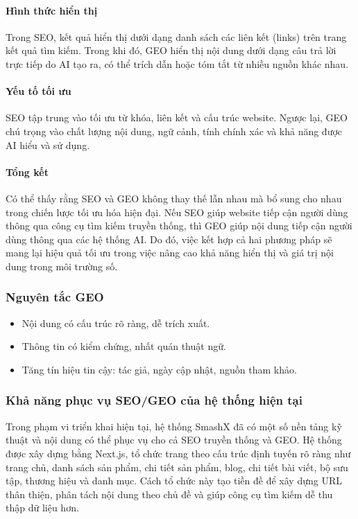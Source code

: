 \documentclass[13pt]{article}
\begin{document}
\paragraph{Hình thức hiển thị}
Trong SEO, kết quả hiển thị dưới dạng danh sách các liên kết (links) trên trang kết quả tìm kiếm. Trong khi đó, GEO hiển thị nội dung dưới dạng câu trả lời trực tiếp do AI tạo ra, có thể trích dẫn hoặc tóm tắt từ nhiều nguồn khác nhau.

\paragraph{Yếu tố tối ưu}
SEO tập trung vào tối ưu từ khóa, liên kết và cấu trúc website. Ngược lại, GEO chú trọng vào chất lượng nội dung, ngữ cảnh, tính chính xác và khả năng được AI hiểu và sử dụng.

\paragraph{Tổng kết}
Có thể thấy rằng SEO và GEO không thay thế lẫn nhau mà bổ sung cho nhau trong chiến lược tối ưu hóa hiện đại. Nếu SEO giúp website tiếp cận người dùng thông qua công cụ tìm kiếm truyền thống, thì GEO giúp nội dung tiếp cận người dùng thông qua các hệ thống AI. Do đó, việc kết hợp cả hai phương pháp sẽ mang lại hiệu quả tối ưu trong việc nâng cao khả năng hiển thị và giá trị nội dung trong môi trường số.
\subsubsection{Nguyên tắc GEO}
\begin{itemize}
    \item Nội dung có cấu trúc rõ ràng, dễ trích xuất.
    \item Thông tin có kiểm chứng, nhất quán thuật ngữ.
    \item Tăng tín hiệu tin cậy: tác giả, ngày cập nhật, nguồn tham khảo.
\end{itemize}

\subsubsection{Khả năng phục vụ SEO/GEO của hệ thống hiện tại}

Trong phạm vi triển khai hiện tại, hệ thống SmashX đã có một số nền tảng kỹ thuật và nội dung có thể phục vụ cho cả SEO truyền thống và GEO. Hệ thống được xây dựng bằng Next.js, tổ chức trang theo cấu trúc định tuyến rõ ràng như trang chủ, danh sách sản phẩm, chi tiết sản phẩm, blog, chi tiết bài viết, bộ sưu tập, thương hiệu và danh mục. Cách tổ chức này tạo tiền đề để xây dựng URL thân thiện, phân tách nội dung theo chủ đề và giúp công cụ tìm kiếm dễ thu thập dữ liệu hơn.
\end{document}
